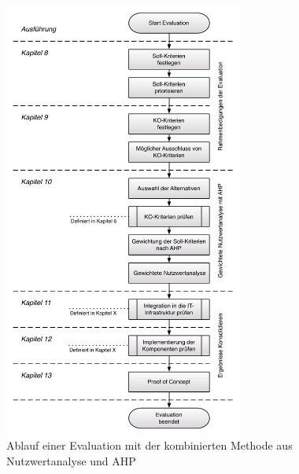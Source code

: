   \begin{figure}[h!]
    \begin{center}
      \includegraphics[width=0.7\textwidth]{./image/kompletterAblaufDerEvaluation.pdf}
      \caption{Ablauf einer Evaluation mit der kombinierten Methode aus
      Nutzwertanalyse und \ac{AHP}}
      \label{img:ablaufEvaluation}
    \end{center}
  \end{figure}
